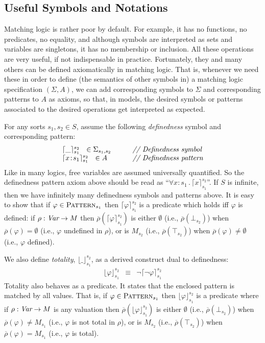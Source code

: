 \documentclass[UTF8,11pt]{article}
\theoremstyle{plain}
\theoremstyle{definition}
\theoremstyle{remark}
\newcommand{\cln}{{:}}
\newcommand{\Pattern}{\textsc{Pattern}\xspace}
\newcommand{\ra}{\rightarrow}
\begin{document}
\subsection{Useful Symbols and Notations}
\label{sec:useful}

Matching logic is rather poor by default.
For example, it has no functions, no predicates, no equality, and although
symbols are interpreted as sets and variables are singletons, it has no
membership or inclusion.
All these operations are very useful, if not indispensable in practice.
Fortunately, they and many others can be defined axiomatically in matching
logic.
That is, whenever we need these in order to define (the semantics of other
symbols in) a matching logic specification $(\Sigma,A)$, we can add
corresponding symbols to $\Sigma$ and corresponding patterns to $A$ as axioms,
so that, in models, the desired symbols or patterns associated to the
desired operations get interpreted as expected.

For any sorts $s_1,s_2\in S$, assume the following \emph{definedness}
symbol and corresponding pattern:
$$
\begin{array}{l@{\hspace*{7ex}}l}
\lceil\_\rceil_{s_1}^{s_2} \ \ \in \Sigma_{s_1,s_2}
& \mbox{\it // Definedness symbol} \\
\lceil x\!:\! s_1 \rceil_{s_1}^{s_2} \ \ \in A & \mbox{\it // Definedness pattern}
\end{array}
$$
Like in many logics, free variables are assumed universally quantified.
So the definedness pattern axiom above should be read as
``$\forall x\cln s_1\,.\,\lceil x \rceil_{s_1}^{s_2}$''.
If $S$ is infinite, then we have infinitely many definedness symbols and patterns
above.
It is easy to show that if $\varphi \in \Pattern_{s_1}$ then
$\lceil\varphi\rceil_{s_1}^{s_2}$ is a predicate which holds iff $\varphi$ is
defined:
if $\rho : \Var \ra M$ then
$\overline{\rho}(\lceil\varphi\rceil_{s_1}^{s_2})$ is either $\emptyset$
(i.e., $\overline{\rho}(\bot_{s_2})$)
when $\overline{\rho}(\varphi) = \emptyset$
(i.e., $\varphi$ undefined in $\rho$), or is $M_{s_2}$
(i.e., $\overline{\rho}(\top_{s_2})$) 
when $\overline{\rho}(\varphi) \neq \emptyset$ (i.e., $\varphi$ defined).

We also define \emph{totality}, $\lfloor\_\rfloor_{s_1}^{s_2}$, as a derived
construct dual to definedness:
$$
\begin{array}{lcl}
\lfloor\varphi\rfloor_{s_1}^{s_2}
& \equiv &
\neg\lceil\neg\varphi\rceil_{s_1}^{s_2}
\end{array}
$$
Totality also behaves as a predicate.
It states that the enclosed pattern is matched by all values.
That is, if $\varphi \in \Pattern_{s_1}$ then $\lfloor\varphi\rfloor_{s_1}^{s_2}$
is a predicate where if $\rho : \Var \ra M$ is any valuation
then $\overline{\rho}(\lfloor\varphi\rfloor_{s_1}^{s_2})$ is either $\emptyset$
(i.e., $\overline{\rho}(\bot_{s_2})$)
when $\overline{\rho}(\varphi) \neq M_{s_1}$
(i.e., $\varphi$ is not total in $\rho$), or is $M_{s_2}$
(i.e., $\overline{\rho}(\top_{s_2})$) 
when $\overline{\rho}(\varphi) = M_{s_1}$
(i.e., $\varphi$ is total).
\end{document}
